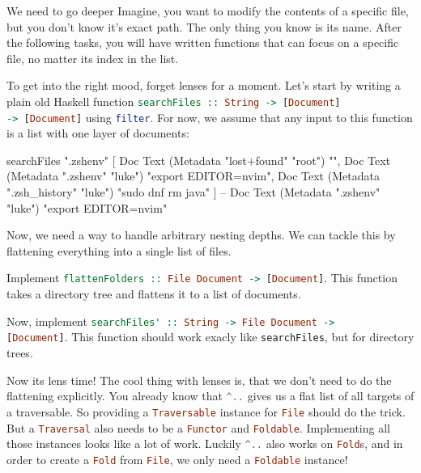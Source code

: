 \documentclass{exercise}
\newcommand\h[2][]{\lstinline[language=haskell,#1]{#2}}
\def\m#1{\tikzmark{#1}}
\begin{document}
\begin{exercise}{We need to go deeper}
		Imagine, you want to modify the contents of a specific file, but you don't know
		it's exact path. The only thing you know is its name. After the following tasks,
		you will have written functions that can focus on a specific file, no matter
		its index in the list.
		\begin{tasks}[resume*]
			\item To get into the right mood, forget lenses for a moment. Let's start by
				writing a plain old Haskell function \h{searchFiles :: String -> [Document]
				-> [Document]} using \h{filter}. For now, we assume that any input to
				this function is a list with one layer of documents:
				\begin{haskell}
searchFiles ".zshenv" [
  Doc Text (Metadata "lost+found" "root") "",
  Doc Text (Metadata ".zshenv" "luke") "export EDITOR=nvim",
  Doc Text (Metadata ".zsh_history" "luke") "sudo dnf rm java"
]
-- Doc Text (Metadata ".zshenv" "luke") "export EDITOR=nvim"
				\end{haskell}
		\end{tasks}
		Now, we need a way to handle arbitrary nesting depths. We can tackle this by
		flattening everything into a single list of files.
		\begin{tasks}[resume*]
			\item \m{op1}Implement \h{flattenFolders :: File Document -> [Document]}. This
				function takes a directory tree and flattens it to a list of documents.
			\item \m{op2}Now, implement \h{searchFiles' :: String -> File Document ->
				[Document]}. This function should work exacly like \h{searchFiles}, but
				for directory trees.
		\end{tasks}
		Now its lens time! The cool thing with lenses is, that we don't need to do the
		flattening explicitly. You already know that \h{^..} gives us a flat list of all
		targets of a traversable. So providing a \h{Traversable} instance for \h{File}
		should do the trick. But a \h{Traversal} also needs to be a \h{Functor} and
		\h{Foldable}. Implementing all those instances looks like a lot of work. Luckily
		\h{^..} also works on \h{Fold}s, and in order to create a \h{Fold} from
		\h{File}, we only need a \h{Foldable} instance!
		\begin{tasks}[resume*]

\end{tasks}
\end{exercise}
\end{document}
